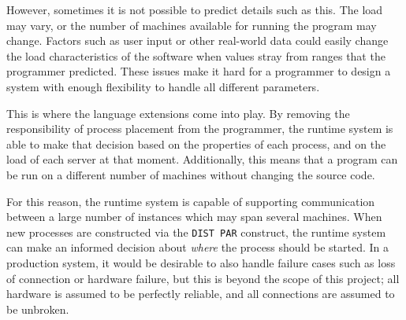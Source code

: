However, sometimes it is not possible to predict details such as this. The load
may vary, or the number of machines available for running the program may
change. Factors such as user input or other real-world data could easily change
the load characteristics of the software when values stray from ranges that the
programmer predicted. These issues make it hard for a programmer to design
a system with enough flexibility to handle all different parameters.

This is where the language extensions come into play. By removing the
responsibility of process placement from the programmer, the runtime system is
able to make that decision based on the properties of each process, and on the
load of each server at that moment. Additionally, this means that a program can
be run on a different number of machines without changing the source code.

For this reason, the runtime system is capable of supporting communication
between a large number of instances which may span several machines. When new
processes are constructed via the \texttt{DIST PAR} construct, the runtime
system can make an informed decision about \textit{where} the process should be
started. In a production system, it would be desirable to also handle failure
cases such as loss of connection or hardware failure, but this is beyond the
scope of this project; all hardware is assumed to be perfectly reliable, and all
connections are assumed to be unbroken.
